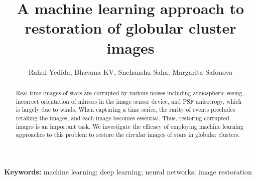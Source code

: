 \documentclass[12pt,a4paper]{article}
\title{A machine learning approach to restoration of globular cluster images}
\author{Rahul Yedida, Bhavana KV, Snehanshu Saha, Margarita Safonova}
\date{}
\begin{document}
\maketitle
\begin{abstract}
Real-time images of stars are corrupted by various noises including atmospheric seeing, incorrect orientation of mirrors in the image sensor device, and PSF anisotropy, which is largely due to winds. When capturing a time series, the rarity of events precludes retaking the images, and each image becomes essential. Thus, restoring corrupted images is an important task. We investigate the efficacy of employing machine learning approaches to this problem to restore the circular images of stars in globular clusters.
\end{abstract}
\textbf{Keywords:} machine learning; deep learning; neural networks; image restoration
\end{document}
